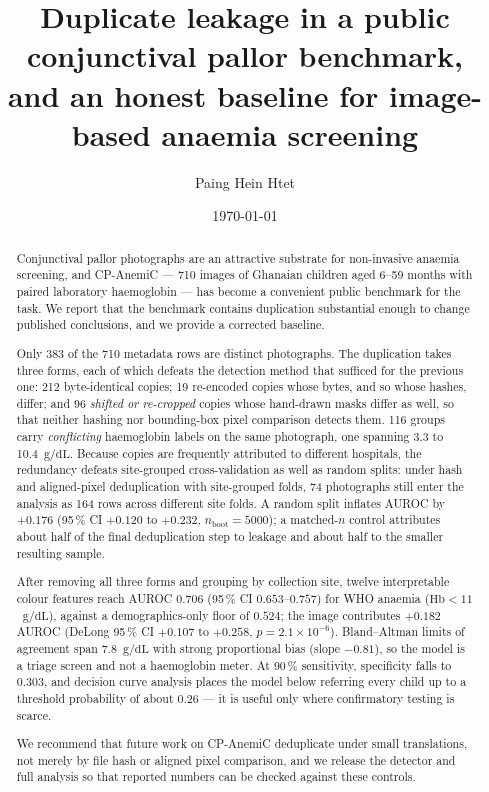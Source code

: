 \documentclass[11pt,a4paper]{article}
\title{\bfseries Duplicate leakage in a public conjunctival pallor benchmark,\\
and an honest baseline for image-based anaemia screening}
\author[1]{Paing Hein Htet}
\affil[1]{Department of Medical Physics and Biomedical Engineering,
University College London, London, United Kingdom}
\affil[ ]{\texttt{zcemphh@ucl.ac.uk}}
\date{\today}
\newcommand{\gdl}{\ensuremath{\mathrm{g/dL}}}
\newcommand{\auroc}{AUROC}
\begin{document}
\maketitle

\begin{abstract}
\noindent
Conjunctival pallor photographs are an attractive substrate for non-invasive anaemia
screening, and CP-AnemiC --- 710 images of Ghanaian children aged 6--59 months with paired
laboratory haemoglobin --- has become a convenient public benchmark for the task. We report
that the benchmark contains duplication substantial enough to change published
conclusions, and we provide a corrected baseline.

Only 383 of the 710 metadata rows are distinct photographs. The duplication takes three forms,
each of which defeats the detection method that sufficed for the previous one: 212 byte-identical copies; 19 re-encoded copies whose
bytes, and so whose hashes, differ; and 96 \emph{shifted or re-cropped} copies whose hand-drawn
masks differ as well, so that neither hashing nor bounding-box pixel comparison detects them.
116 groups carry \emph{conflicting} haemoglobin labels on the same photograph, one spanning 3.3
to 10.4~\gdl. Because copies are frequently attributed to different hospitals, the redundancy
defeats site-grouped cross-validation as well as random splits: under hash and aligned-pixel
deduplication with site-grouped folds, 74 photographs still enter the analysis as 164 rows across
different site folds. A random split inflates \auroc{} by $+0.176$ (95\,\% CI $+0.120$ to
$+0.232$, $n_{\text{boot}}=5000$); a matched-$n$ control attributes about half of the final
deduplication step to leakage and about half to the smaller resulting sample.

After removing all three forms and grouping by collection site, twelve interpretable colour
features reach \auroc{} $0.706$ (95\,\% CI $0.653$--$0.757$) for WHO anaemia
($\mathrm{Hb}<11$~\gdl), against a demographics-only floor of $0.524$; the image contributes
$+0.182$ \auroc{} (DeLong 95\,\% CI $+0.107$ to $+0.258$, $p=2.1\times10^{-6}$). Bland--Altman
limits of agreement span $7.8$~\gdl{} with strong proportional bias (slope $-0.81$), so the model
is a triage screen and not a haemoglobin meter. At 90\,\% sensitivity, specificity falls to
$0.303$, and decision curve analysis places the model below referring every child up to a threshold
probability of about $0.26$ --- it is useful only where confirmatory testing is scarce.

We recommend that future work on CP-AnemiC deduplicate under small translations, not merely by file
hash or aligned pixel comparison, and we release the detector and full analysis so that reported
numbers can be checked against these controls.
\end{abstract}
\end{document}
